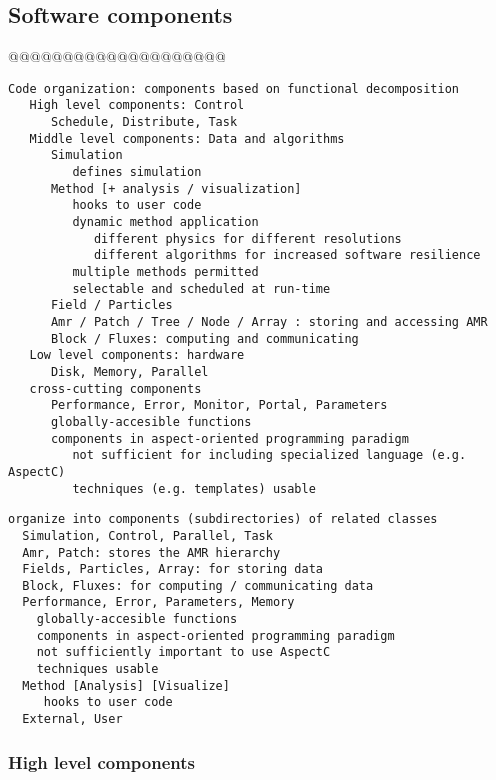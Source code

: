 \documentclass{article}
\begin{document}
\subsection{Software components} \label{ss:design-components}

@@@@@@@@@@@@@@@@@@@@

\begin{verbatim}
Code organization: components based on functional decomposition
   High level components: Control
      Schedule, Distribute, Task
   Middle level components: Data and algorithms
      Simulation
         defines simulation
      Method [+ analysis / visualization]
         hooks to user code
         dynamic method application
            different physics for different resolutions
            different algorithms for increased software resilience
         multiple methods permitted
         selectable and scheduled at run-time
      Field / Particles 
      Amr / Patch / Tree / Node / Array : storing and accessing AMR
      Block / Fluxes: computing and communicating
   Low level components: hardware 
      Disk, Memory, Parallel      
   cross-cutting components
      Performance, Error, Monitor, Portal, Parameters
      globally-accesible functions
      components in aspect-oriented programming paradigm
         not sufficient for including specialized language (e.g. AspectC)
         techniques (e.g. templates) usable
\end{verbatim}

\begin{verbatim}
organize into components (subdirectories) of related classes
  Simulation, Control, Parallel, Task
  Amr, Patch: stores the AMR hierarchy
  Fields, Particles, Array: for storing data
  Block, Fluxes: for computing / communicating data
  Performance, Error, Parameters, Memory
    globally-accesible functions
    components in aspect-oriented programming paradigm
    not sufficiently important to use AspectC
    techniques usable
  Method [Analysis] [Visualize]
     hooks to user code
  External, User
\end{verbatim}


\subsubsection{High level components}
\end{document}
